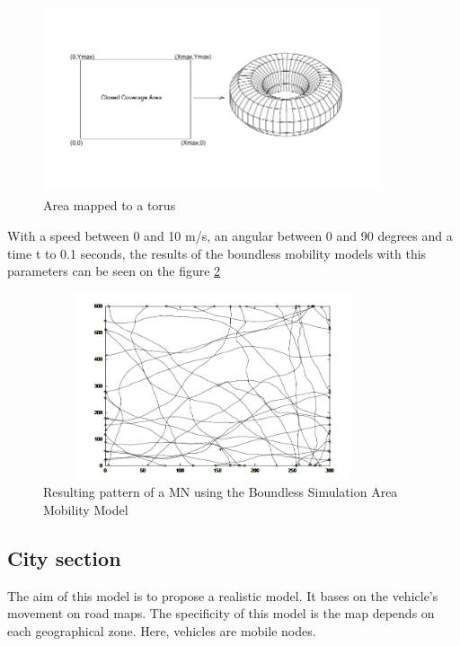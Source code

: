 \begin{figure}[h]
\center
\includegraphics[width=10cm,height=55mm]{../images/boundlessmobilitymodel1.png}
\caption{\label{BoundlessFig}Area mapped to a torus}
\end{figure}


With a speed between 0 and 10 m/s, an angular between 0 and 90 degrees and a time t to 0.1 seconds, the results of the boundless mobility models with this parameters can be seen on the figure \ref{BoundlessFig2}\\

\begin{figure}[h]
\center
\includegraphics[width=10cm,height=55mm]{../images/boundlessmobilitymodel2.png}
\caption{\label{BoundlessFig2}Resulting pattern of a MN using the Boundless Simulation Area Mobility Model}
\end{figure}

\newpage

\subsection{City section}

The aim of this model is to propose a realistic model. It bases on the vehicle's movement on road maps. The specificity of this model is the map depends on each geographical zone. Here, vehicles are mobile nodes.\\

